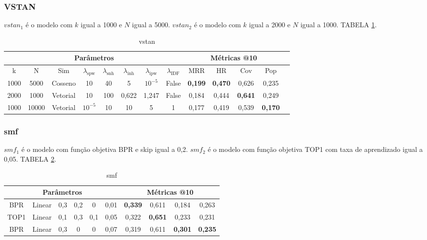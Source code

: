 \subsubsection{VSTAN}
$vstan_1$ é o modelo com $k$ igual a 1000 e $N$ igual a 5000. 
$vstan_2$ é o modelo com $k$ igual a 2000 e $N$ igual a 1000. TABELA \ref{app:vstan}.


\begin{table}
    \centering
    \begin{tabular}{|c|c|c|c|c|c|c|c|c|c|c|c|c|}
      \hline
      \multicolumn{8}{|c|}{Parâmetros} & \multicolumn{4}{c|}{Métricas @10} \\
      \hline
      k & N & Sim & $\lambda_{\text{spw}}$ & $\lambda_{\text{snh}}$ & $\lambda_{\text{inh}}$ & $\lambda_{\text{ipw}}$ & $\lambda_{\text{IDF}}$ & MRR & HR & Cov & Pop \\
      \hline
      1000 & 5000 & Cosseno & 10 & 40 & 5 & $10^{-5}$ & False & \textbf{0,199} & \textbf{0,470} & 0,626 & 0,235 \\
      \hline
      2000 & 1000 & Vetorial & 10 & 100 & 0,622 & 1,247 & False & 0,184 & 0,444 & \textbf{0,641} & 0,249 \\
      \hline
      1000 & 10000 & Vetorial & $10^{-5}$ & 10 & 10 & 5 & 1 & 0,177 & 0,419 & 0,539 & \textbf{0,170} \\
      \hline
    \end{tabular}
    \caption{vstan}
    \label{app:vstan}
  \end{table}

\subsubsection{smf}
$smf_{1}$ é o modelo com função objetiva BPR e skip igual a 0,2.
$smf_{2}$ é o modelo com função objetiva TOP1 com taxa de aprendizado igual a 0,05.
TABELA \ref{app:smf}.
\begin{table}
  \centering
  \begin{tabular}{|c|c|c|c|c|c|c|c|c|c|}
    \hline
      \multicolumn{6}{|c|}{Parâmetros} & \multicolumn{4}{c|}{Métricas @10} \\
      \hline
      BPR & Linear & 0,3 & 0,2 & 0 & 0,01 & \textbf{0,339} & 0,611 & 0,184 & 0,263 \\
      \hline
      TOP1 & Linear & 0,1 & 0,3 & 0,1 & 0,05 & 0,322 & \textbf{0,651} & 0,233 & 0,231 \\
      \hline
      BPR & Linear & 0,3 & 0 & 0 & 0,07 & 0,319 & 0,611 & \textbf{0,301} & \textbf{0,235} \\
      \hline
      \end{tabular}
      \caption{smf}
      \label{app:smf}
    \end{table}


